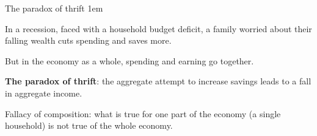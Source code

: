 \documentclass[11pt,aspectratio=43,usenames,dvipsnames]{beamer}
\let\olditemize=\itemize
\let\endolditemize=\enditemize
\renewenvironment{itemize}{\olditemize \itemsep1em}{\endolditemize}
\theoremstyle{definition}
\begin{document}
\begin{frame}{The paradox of thrift}
\label{slide:The_paradox_of_thrift}
    \begin{itemize}
        \item In a recession, faced with a household budget deficit, a family worried about their falling wealth cuts spending and saves more.
        \item But in the economy as a whole, \alert{spending and earning go together.}
        \item \textbf{The paradox of thrift}: the aggregate attempt to increase savings leads to a fall in aggregate income.
        \item \alert{Fallacy of composition}: what is true for one part of the economy (a single household) is not true of the whole economy.
    \end{itemize}

\end{frame}
\end{document}
